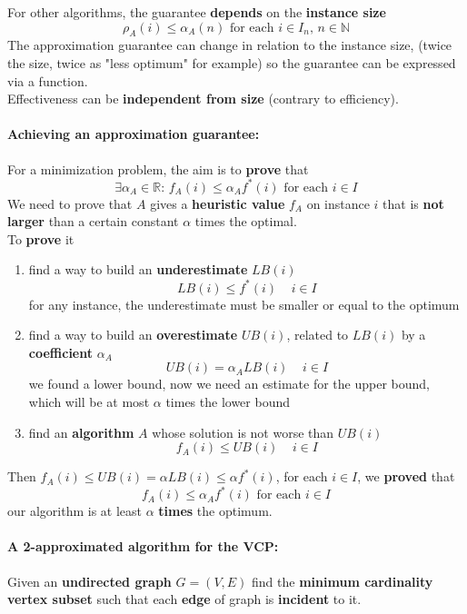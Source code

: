 For other algorithms, the guarantee \textbf{depends} on the \textbf{instance size}
$$ \rho_A (i) \leq \alpha_A (n) \text{ for each } i \in I_n, \, n \in \mathbb{N} $$
The approximation guarantee can change in relation to the instance size, (twice the size, twice as "less optimum" for example) so the guarantee can be expressed via a function.\\

Effectiveness can be \textbf{independent from size} (contrary to efficiency).\\

\newpage

\paragraph{Achieving an approximation guarantee:} For a minimization problem, the aim is to \textbf{prove} that
$$ \exists \alpha_A \in \mathbb{R} : \, f_A (i) \leq \alpha_A f^\ast (i) \text{ for each } i \in I $$
We need to prove that $A$ gives a \textbf{heuristic value} $f_A$ on instance $i$ that is \textbf{not larger} than a certain constant $\alpha$ times the optimal.\\

To \textbf{prove} it
\begin{enumerate}
	\item find a way to build an \textbf{underestimate} $LB(i)$
	$$ LB(i) \leq f^\ast (i) \;\;\;\; i \in I $$
	for any instance, the underestimate must be smaller or equal to the optimum
	\item find a way to build an \textbf{overestimate} $UB(i)$, related to $LB(i)$ by a \textbf{coefficient} $\alpha_A$
	$$ UB(i) = \alpha_A LB(i) \;\;\;\; i \in I $$
	we found a lower bound, now we need an estimate for the upper bound, which will be at most $\alpha$ times the lower bound
	\item find an \textbf{algorithm} $A$ whose solution is not worse than $UB(i)$
	$$ f_A (i) \leq UB(i) \;\;\;\; i \in I $$
\end{enumerate}
Then $f_A (i) \leq UB(i) = \alpha LB(i) \leq \alpha f^\ast (i)$, for each $i \in I$, we \textbf{proved} that
$$ f_A (i) \leq \alpha_A f^\ast (i) \text{ for each } i \in I $$
our algorithm is at least $\alpha$ \textbf{times} the optimum.\\

\newpage

\paragraph{A 2-approximated algorithm for the VCP:} Given an \textbf{undirected graph} $G = (V , E )$ find the \textbf{minimum cardinality vertex subset} such that each \textbf{edge} of graph is \textbf{incident} to it.\\

